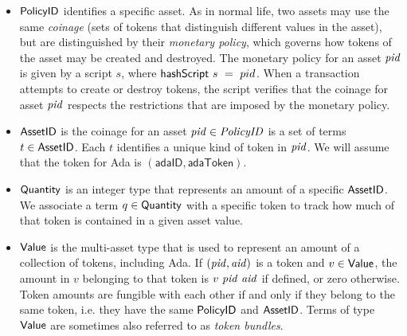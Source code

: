 \begin{itemize}
  \item $\mathsf{PolicyID}$ identifies a specific asset.  As in normal life, two
    assets may use the same \emph{coinage} (sets of tokens that distinguish different values in the asset),
    but are distinguished by their \emph{monetary policy}, which governs how tokens of the asset may be created
    and destroyed.
    The monetary policy for an asset $\mathit{pid}$ is given by a script
    $s$, where $\mathsf{hashScript}~s~=~pid$. When a transaction attempts to create or destroy tokens,
    the script verifies that the coinage for asset $\mathit{pid}$
    respects the restrictions that are imposed by the
    monetary policy.



  \item $\mathsf{AssetID}$ is the coinage for an asset $\mathit{pid} \in \mathit{PolicyID}$ is a set of terms
    $t\in\mathsf{AssetID}$.  Each $t$ identifies a unique kind of token in $\mathit{pid}$.
    We will assume that the token for Ada is $(\mathsf{adaID}, \mathsf{adaToken})$.

  \item $\mathsf{Quantity}$ is an integer type that represents an amount of a specific $\mathsf{AssetID}$. We associate
    a term $q\in\mathsf{Quantity}$ with a specific token to track how much of that token is contained in a given asset value.

  \item $\mathsf{Value}$ is the multi-asset type that is used to represent
    an amount of a collection of tokens, including Ada. If $(\mathit{pid}, \mathit{aid})$ is a token and $v \in \mathsf{Value}$,
    the amount in $v$ belonging to that token is $v~\mathit{pid}~\mathit{aid}$ if defined, or zero otherwise.
    Token amounts are fungible with each other if and only if they belong to the same token,
    i.e. they have the same $\mathsf{PolicyID}$ and $\mathsf{AssetID}$. Terms of type $\mathsf{Value}$ are sometimes also referred to as
    \emph{token bundles}.


\end{itemize}
